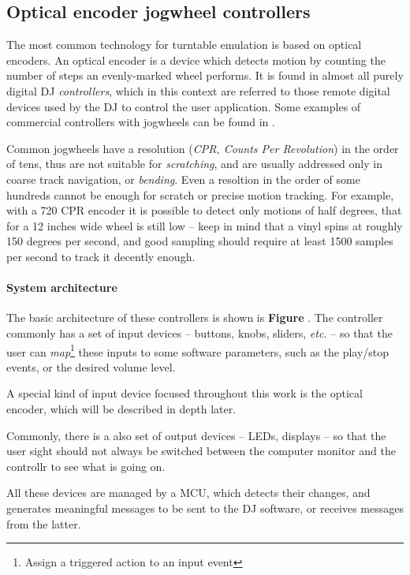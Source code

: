 \documentclass[a4paper,10pt]{article}
\begin{document}
\begin{multicols}{2}
\subsection{Optical encoder jogwheel controllers}

The most common technology for turntable emulation is based on optical encoders.
An optical encoder is a device which detects motion by counting the number of steps
an evenly-marked wheel performs. It is found in almost all purely digital DJ
\emph{controllers}, which in this context are referred to those remote digital
devices used by the DJ to control the user application. Some examples of commercial
controllers with jogwheels can be found in \CITEME.

Common jogwheels have a resolution (\emph{CPR, Counts Per Revolution}) in the order of
tens, thus are not suitable for \emph{scratching}\CITEME, and are usually addressed
only in coarse track navigation, or \emph{bending}\CITEME.
Even a resoltion in the order of some hundreds cannot be enough for scratch or precise
motion tracking. For example, with a 720 CPR encoder it is possible to detect only
motions of half degrees, that for a 12 inches wide wheel is still low -- keep in mind
that a vinyl spins at roughly 150 degrees per second, and good sampling should require
at least 1500 samples per second to track it decently enough.


\paragraph{System architecture}
The basic architecture of these controllers is shown is \textbf{Figure \CITEME}.
The controller commonly has a set of input devices -- buttons, knobs,
sliders, \textit{etc.} -- so that the user can \emph{map}\footnote{
	Assign a triggered action to an input event
} these inputs to some software parameters, such as the play/stop events, or the desired
volume level.

A special kind of input device focused throughout this work is the optical encoder,
\TODO which will be described in depth later.

Commonly, there is a also set of output devices -- LEDs, displays -- so that the
user sight should not always be switched between the computer monitor and the controllr
to see what is going on.

All these devices are managed by a MCU, which detects their changes, and generates
meaningful messages to be sent to the DJ software, or receives messages from the latter.


\end{multicols}
\end{document}
